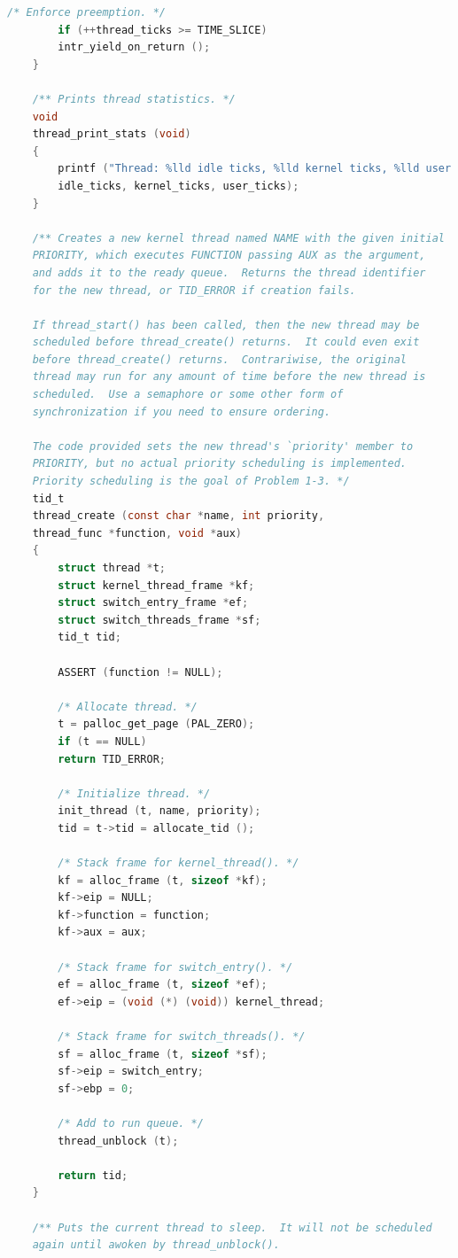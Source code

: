 \documentclass{article}
\begin{document}
\begin{lstlisting}[language=C, title=\texttt{thread.c}]
		/* Enforce preemption. */
		if (++thread_ticks >= TIME_SLICE)
		intr_yield_on_return ();
	}
	
	/** Prints thread statistics. */
	void
	thread_print_stats (void) 
	{
		printf ("Thread: %lld idle ticks, %lld kernel ticks, %lld user ticks\n",
		idle_ticks, kernel_ticks, user_ticks);
	}
	
	/** Creates a new kernel thread named NAME with the given initial
	PRIORITY, which executes FUNCTION passing AUX as the argument,
	and adds it to the ready queue.  Returns the thread identifier
	for the new thread, or TID_ERROR if creation fails.
	
	If thread_start() has been called, then the new thread may be
	scheduled before thread_create() returns.  It could even exit
	before thread_create() returns.  Contrariwise, the original
	thread may run for any amount of time before the new thread is
	scheduled.  Use a semaphore or some other form of
	synchronization if you need to ensure ordering.
	
	The code provided sets the new thread's `priority' member to
	PRIORITY, but no actual priority scheduling is implemented.
	Priority scheduling is the goal of Problem 1-3. */
	tid_t
	thread_create (const char *name, int priority,
	thread_func *function, void *aux) 
	{
		struct thread *t;
		struct kernel_thread_frame *kf;
		struct switch_entry_frame *ef;
		struct switch_threads_frame *sf;
		tid_t tid;
		
		ASSERT (function != NULL);
		
		/* Allocate thread. */
		t = palloc_get_page (PAL_ZERO);
		if (t == NULL)
		return TID_ERROR;
		
		/* Initialize thread. */
		init_thread (t, name, priority);
		tid = t->tid = allocate_tid ();
		
		/* Stack frame for kernel_thread(). */
		kf = alloc_frame (t, sizeof *kf);
		kf->eip = NULL;
		kf->function = function;
		kf->aux = aux;
		
		/* Stack frame for switch_entry(). */
		ef = alloc_frame (t, sizeof *ef);
		ef->eip = (void (*) (void)) kernel_thread;
		
		/* Stack frame for switch_threads(). */
		sf = alloc_frame (t, sizeof *sf);
		sf->eip = switch_entry;
		sf->ebp = 0;
		
		/* Add to run queue. */
		thread_unblock (t);
		
		return tid;
	}
	
	/** Puts the current thread to sleep.  It will not be scheduled
	again until awoken by thread_unblock().
	

\end{lstlisting}
\end{document}
